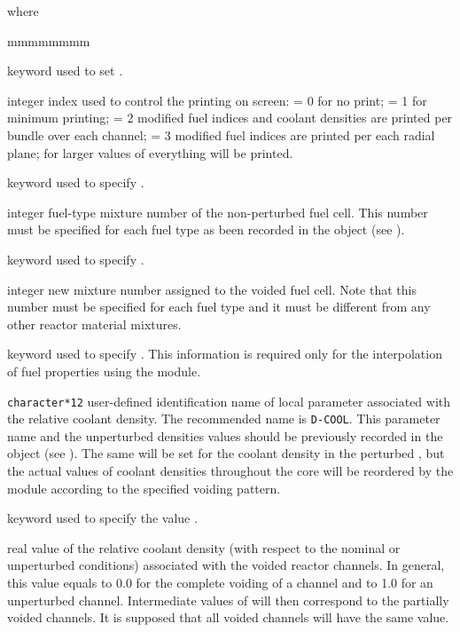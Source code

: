 \noindent where
\begin{ListeDeDescription}{mmmmmmmm}

\item[\moc{EDIT}] keyword used to set .

\item[\dusa{iprint}] integer index used to control the printing on screen:  = 0  for
no print; = 1 for minimum printing; = 2 modified fuel indices and coolant densities
are printed per bundle over each channel; = 3 modified fuel indices are printed
per each radial plane; for larger values of  everything will be printed.

\item[\moc{MIX-FUEL}] keyword used to specify .

\item[\dusa{mixF}] integer fuel-type mixture number of the non-perturbed fuel cell.
This number must be specified for each fuel type as been recorded in the 
object (see ).

\item[\moc{MIX-VOID}] keyword used to specify .

\item[\dusa{mixV}] integer new mixture number assigned to the voided fuel cell.
Note that this number must be specified for each fuel type and it must be different
from any other reactor material mixtures.

\item[\moc{DENS-COOL}] keyword used to specify . This information
is required only for the interpolation of fuel properties using the  module.

\item[\dusa{PNAME}] \texttt{character*12} user-defined identification name
of local parameter associated with the relative coolant density. The recommended name
is {\tt D-COOL}. This parameter
name and the unperturbed densities values should be previously recorded in the
 object (see ). The same  will be
set for the coolant density in the perturbed , but the actual values
of coolant densities throughout the core will be reordered by the  module
according to the specified voiding pattern.

\item[\moc{SET}] keyword used to specify the value .

\item[\dusa{dcoolV}] real value of the relative coolant density (with respect to
the nominal or unperturbed conditions) associated with the voided reactor channels.
In general, this value equals to 0.0 for the complete voiding of a channel and to
1.0 for an unperturbed channel. Intermediate values of  will then
correspond to the partially voided channels. It is supposed that all voided channels
will have the same  value.


\end{ListeDeDescription}
